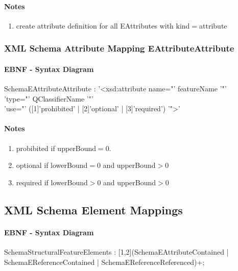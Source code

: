 \documentclass[11pt,a4paper]{article}
\begin{document}
\paragraph{Notes}
\begin{enumerate}
\item create attribute definition for all EAttributes with kind$=$attribute
\end{enumerate}

\subsubsection{XML Schema Attribute Mapping EAttributeAttribute}
\paragraph{EBNF - Syntax Diagram}
\begin{rail}
SchemaEAttributeAttribute :
'<xsd:attribute name="' featureName '"' \\
 'type="' QClassifierName '"' \\
 'use="' ([1]'prohibited' | [2]'optional' | [3]'required') '">' 
\end{rail}

\paragraph{Notes}
\begin{enumerate}
\item probibited if upperBound$=$0.
\item optional if lowerBound$=$0 and upperBound$>$0
\item required if lowerBound$>$0 and upperBound$>$0
\end{enumerate}

\subsection{XML Schema Element Mappings}
\paragraph{EBNF - Syntax Diagram}
\begin{rail}
SchemaStructuralFeatureElements : [1,2](SchemaEAttributeContained | SchemaEReferenceContained | SchemaEReferenceReferenced)+;
\end{rail}
\end{document}
